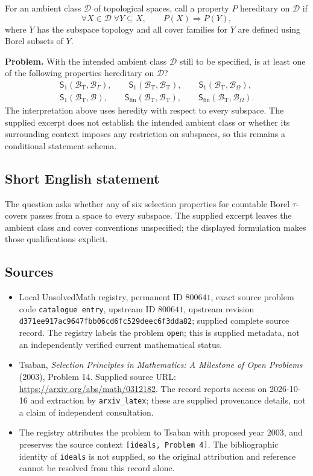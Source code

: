 \documentclass[11pt]{article}
\begin{document}
For an ambient class \(\mathscr D\) of topological spaces, call a property \(P\) hereditary on \(\mathscr D\) if
\[
\forall X\in\mathscr D\;\forall Y\subseteq X,\qquad P(X)\Longrightarrow P(Y),
\]
where \(Y\) has the subspace topology and all cover families for \(Y\) are defined using Borel subsets of \(Y\).

\textbf{Problem.} With the intended ambient class \(\mathscr D\) still to be specified, is at least one of the following properties hereditary on \(\mathscr D\)?
\[
\begin{gathered}
\mathsf S_1(\mathcal B_{\mathrm T},\mathcal B_\Gamma),\qquad
\mathsf S_1(\mathcal B_{\mathrm T},\mathcal B_{\mathrm T}),\qquad
\mathsf S_1(\mathcal B_{\mathrm T},\mathcal B_\Omega),\\
\mathsf S_1(\mathcal B_{\mathrm T},\mathcal B),\qquad
\mathsf S_{\mathrm{fin}}(\mathcal B_{\mathrm T},\mathcal B_{\mathrm T}),\qquad
\mathsf S_{\mathrm{fin}}(\mathcal B_{\mathrm T},\mathcal B_\Omega).
\end{gathered}
\]
The interpretation above uses heredity with respect to every subspace. The supplied excerpt does not establish the intended ambient class or whether its surrounding context imposes any restriction on subspaces, so this remains a conditional statement schema.
\subsection{Short English statement}
The question asks whether any of six selection properties for countable Borel \(\tau\)-covers passes from a space to every subspace. The supplied excerpt leaves the ambient class and cover conventions unspecified; the displayed formulation makes those qualifications explicit.
\subsection{Sources}
\begin{itemize}
\item Local UnsolvedMath registry, permanent ID \(800641\), exact source problem code \texttt{catalogue entry}, upstream ID \(800641\), upstream revision \texttt{d371ee917ac9647fbb06cd6fc529deec6f3dda82}; supplied complete source record. The registry labels the problem \texttt{open}; this is supplied metadata, not an independently verified current mathematical status.
\item Tsaban, \emph{Selection Principles in Mathematics: A Milestone of Open Problems} (2003), Problem 14. Supplied source URL: \url{https://arxiv.org/abs/math/0312182}. The record reports access on 2026-10-16 and extraction by \texttt{arxiv\_latex}; these are supplied provenance details, not a claim of independent consultation.
\item The registry attributes the problem to Tsaban with proposed year 2003, and preserves the source context \texttt{[ideals, Problem 4]}. The bibliographic identity of \texttt{ideals} is not supplied, so the original attribution and reference cannot be resolved from this record alone.
\end{itemize}
\end{document}
